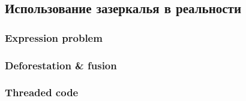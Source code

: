 


\subsection{Использование зазеркалья в реальности}



\subsubsection{Expression problem}




\subsubsection{Deforestation \& fusion}





\subsubsection{Threaded code}

